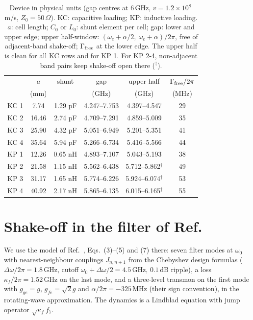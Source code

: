 \documentclass[aps,prresearch,twocolumn,superscriptaddress,nofootinbib,longbibliography,floatfix]{revtex4-2}
\begin{document}
\begin{table}[t]
\caption{\label{tab:ghz}Device in physical units (gap centres at $6$\,GHz, $v=1.2\times10^8$\,m/s, $Z_0=50\,\Omega$).
KC: capacitive loading; KP: inductive loading. $a$: cell length; $C_0$ or $L_0$: shunt element per cell; gap: lower
and upper edge; upper half-window: $(\omega_e+\alpha/2,\ \omega_e+\alpha)/2\pi$, free of adjacent-band shake-off;
$\Gamma_{\rm free}$ at the lower edge. The upper half is clean for all KC rows and for KP 1. For KP 2-4, non-adjacent
band pairs keep shake-off open there ($^\dagger$).}
\begin{ruledtabular}
\footnotesize
\begin{tabular}{lccccc}
 & $a$ & shunt & gap & upper half & $\Gamma_{\rm free}/2\pi$ \\
 & (mm) & & (GHz) & (GHz) & (MHz) \\ \hline
KC 1 & 7.74 & 1.29 pF & 4.247--7.753 & 4.397--4.547 & 29 \\
KC 2 & 16.46 & 2.74 pF & 4.709--7.291 & 4.859--5.009 & 35 \\
KC 3 & 25.90 & 4.32 pF & 5.051--6.949 & 5.201--5.351 & 41 \\
KC 4 & 35.64 & 5.94 pF & 5.266--6.734 & 5.416--5.566 & 44 \\
KP 1 & 12.26 & 0.65 nH & 4.893--7.107 & 5.043--5.193 & 38 \\
KP 2 & 21.58 & 1.15 nH & 5.562--6.438 & 5.712--5.862$^\dagger$ & 49 \\
KP 3 & 31.17 & 1.65 nH & 5.774--6.226 & 5.924--6.074$^\dagger$ & 53 \\
KP 4 & 40.92 & 2.17 nH & 5.865--6.135 & 6.015--6.165$^\dagger$ & 55 \\
\end{tabular}
\end{ruledtabular}
\end{table}


\section{Shake-off in the filter of Ref.~\cite{Thorbeck2024}}\label{app:thorbeck}

We use the model of Ref.~\cite{Thorbeck2024}, Eqs.~(3)--(5) and (7) there: seven filter modes at $\omega_0$ with
nearest-neighbour couplings $J_{n,n+1}$ from the Chebyshev design formulas ($\Delta\omega/2\pi=1.8$\,GHz, cutoff
$\omega_0+\Delta\omega/2=4.5$\,GHz, $0.1$\,dB ripple), a loss $\kappa_f/2\pi=1.52$\,GHz on the last mode, and a
three-level transmon on the first mode with $g_{ge}=g$, $g_{fe}=\sqrt2g$ and $\alpha/2\pi=-325$\,MHz (their sign
convention), in the rotating-wave approximation. The dynamics is a Lindblad equation with jump operator
$\sqrt{\kappa_f}f_7$.
\end{document}
